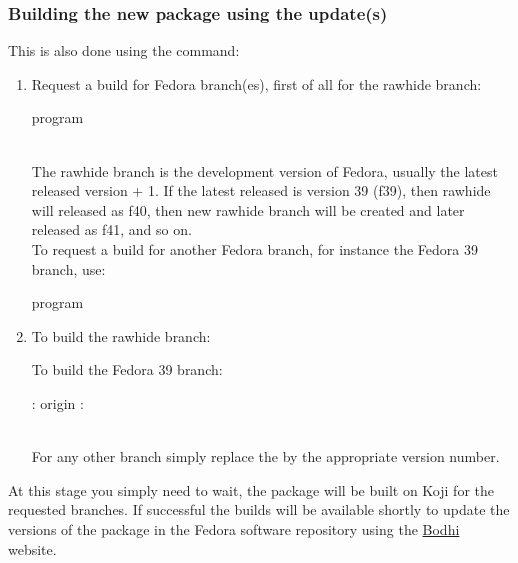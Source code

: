 \subsubsection{Building the new package using the update(s)}

This is also done using the  command:
\begin{enumerate}
\item Request a build for Fedora branch(es), first of all for the rawhide branch:
{\small{
\begin{scripti}
    program 
\end{scripti}}}
\\[-0.5cm]
\noindent The rawhide branch is the development version of Fedora, usually the latest released version + 1. 
If the latest released is version 39 (f39), then rawhide will released as f40, 
then new rawhide branch will be created and later released as f41, and so on. \\[0.25cm]
To request a build for another Fedora branch, for instance the Fedora 39 branch, use:
{\small{
\begin{scripti}
    program 
\end{scripti}}}
\item To build the rawhide branch:
\begin{scripti}
   
   
\end{scripti}
To build the Fedora 39 branch: 
\begin{scripti}
   
   :
   origin :
   
\end{scripti}
\\[-0.5cm]
\noindent For any other branch simply replace the  by the appropriate version number.
\end{enumerate}
At this stage you simply need to wait, the package will be built on Koji for the requested branches. 
If successful the builds will be available shortly to update the versions of the package in the Fedora software repository using the \href{https://bodhi.fedoraproject.org}{Bodhi} website.

